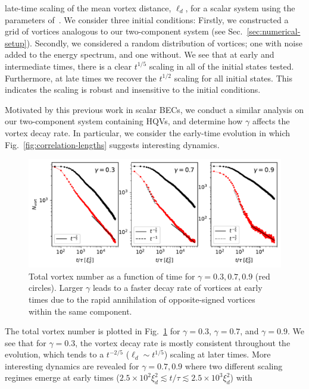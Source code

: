late-time scaling of the mean vortex distance, \(\ell_d\), for a scalar system
using the parameters of~\cite{Karl2017}.
We consider three initial conditions: Firstly, we constructed a grid of vortices
analogous to our two-component system (see Sec.~\ref{sec:numerical-setup}).
Secondly, we considered a random distribution of vortices; one with noise
added to the energy spectrum, and one without.
We see that at early and intermediate times, there is a clear \(t^{1/5}\)
scaling in all of the initial states tested.
Furthermore, at late times we recover the \(t^{1/2}\) scaling for all initial
states.
This indicates the scaling is robust and insensitive to the initial conditions.
\par
Motivated by this previous work in scalar BECs, we conduct a similar analysis
on our two-component system containing HQVs, and determine how \(\gamma \)
affects the vortex decay rate.
In particular, we consider the early-time evolution in which
Fig.~\ref{fig:correlation-lengths} suggests interesting dynamics.
\begin{figure}
    \centering
    \includegraphics[width=\textwidth]{gfx/ch-twoCompDynamics/vortex_number.pdf}
    \caption{Total vortex number as a function of time for
    \(\gamma=0.3,0.7,0.9\) (red circles).
    Larger \(\gamma \) leads to a faster decay rate of vortices at
    early times due to the rapid annihilation of opposite-signed vortices
    within the same component.\label{fig:vortex-number}}
\end{figure}
The total vortex number is plotted in Fig.~\ref{fig:vortex-number} for
\(\gamma=0.3\), \(\gamma=0.7\), and \(\gamma=0.9\).
We see that for \(\gamma=0.3\), the vortex decay rate is mostly consistent
throughout the evolution, which tends to a \(t^{-2/5}\)
(\(\ell_d \sim t^{1/5}\)) scaling at later times.
More interesting dynamics are revealed for \(\gamma=0.7, 0.9\) where two
different scaling regimes emerge at early times
(\(2.5\times10^2\xi_d^2 \lesssim t/\tau \lesssim 2.5\times10^3\xi_d^2\)) with
